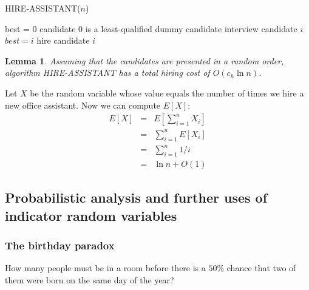 \documentclass[12pt]{article}
\newtheorem{lemma}[theorem]{Lemma}
\begin{document}
HIRE-ASSISTANT($n$)
\begin{algorithmic}[1]
\State best = 0
\Comment candidate $0$ is a least-qualified dummy candidate
	\State interview candidate $i$
        	\State $best = i$
                \State hire candidate $i$
        \EndIf
\EndFor
\end{algorithmic}

\begin{lemma}
  Assuming that the candidates are presented in a random order, algorithm HIRE-ASSISTANT has a total hiring cost of $O(c_h \ln n)$.
\end{lemma}

Let $X$ be the random variable whose value equals the number of times we hire a new office assistant. Now we can compute $E[X]$:
\begin{eqnarray*}
  E[X]
  &=& E \left[ \sum_{i=1}^n X_i \right] \\
  &=& \sum_{i=1}^n E[X_i] \\
  &=& \sum_{i=1}^n 1/i \\
  &=& \ln n + O(1)
\end{eqnarray*}

\subsection{Probabilistic analysis and further uses of indicator random variables}

\subsubsection{The birthday paradox}

How many people must be in a room before there is a $50 \%$ chance that two of them were born on the same day of the year? \\
\end{document}
